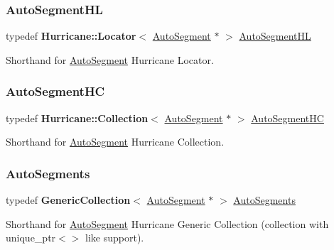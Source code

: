 \subsubsection{\texorpdfstring{Auto\+Segment\+HL}{AutoSegmentHL}}
{\footnotesize\ttfamily typedef \textbf{ Hurricane\+::\+Locator}$<$ \mbox{\hyperlink{classKatabatic_1_1AutoSegment}{Auto\+Segment}} $\ast$ $>$ \mbox{\hyperlink{namespaceKatabatic_a40ef13471fd0e797b75d3c436813fe65}{Auto\+Segment\+HL}}}

Shorthand for \mbox{\hyperlink{classKatabatic_1_1AutoSegment}{Auto\+Segment}} Hurricane Locator. \mbox{\label{namespaceKatabatic_acb3628dc7705fefe38a665cfe43efa6e}} 
\subsubsection{\texorpdfstring{Auto\+Segment\+HC}{AutoSegmentHC}}
{\footnotesize\ttfamily typedef \textbf{ Hurricane\+::\+Collection}$<$ \mbox{\hyperlink{classKatabatic_1_1AutoSegment}{Auto\+Segment}} $\ast$ $>$ \mbox{\hyperlink{namespaceKatabatic_acb3628dc7705fefe38a665cfe43efa6e}{Auto\+Segment\+HC}}}

Shorthand for \mbox{\hyperlink{classKatabatic_1_1AutoSegment}{Auto\+Segment}} Hurricane Collection. \mbox{\label{namespaceKatabatic_a2221b0ddbc24f331809fc86f98e38041}} 
\subsubsection{\texorpdfstring{Auto\+Segments}{AutoSegments}}
{\footnotesize\ttfamily typedef \textbf{ Generic\+Collection}$<$ \mbox{\hyperlink{classKatabatic_1_1AutoSegment}{Auto\+Segment}} $\ast$ $>$ \mbox{\hyperlink{namespaceKatabatic_a2221b0ddbc24f331809fc86f98e38041}{Auto\+Segments}}}

Shorthand for \mbox{\hyperlink{classKatabatic_1_1AutoSegment}{Auto\+Segment}} Hurricane Generic Collection (collection with {\ttfamily unique\+\_\+ptr$<$$>$} like support). \mbox{\label{namespaceKatabatic_ace866cc8e09faf80f71a4087bb8e5870}} 
